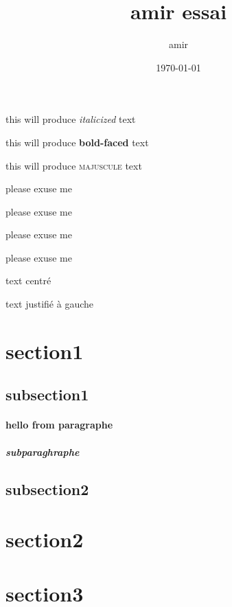 \documentclass[12pt]{article}
\begin{document}
\title{amir essai }
\author{amir}
\date{\today}
\maketitle
this will produce \textit{italicized} text


this will produce \textbf{bold-faced} text

this will produce \textsc{majuscule} text

please exuse me

\begin{large}

 please exuse me
 
 \end{large}
 
 \begin{Large}

 please exuse me
 
 \end{Large}


 \begin{huge}
 
 

 please exuse me
 
\end{huge}

\begin{center}
text centré
\end{center}


\begin{flushleft}
text justifié à gauche
\end{flushleft}

\section{section1}
	\subsection{subsection1}
	\paragraph{hello from paragraphe}
	\subparagraph{subparaghraphe}
	\subsection{subsection2}
\section{section2}
\section{section3}
\end{document}
